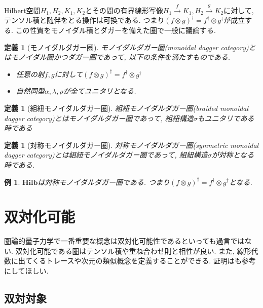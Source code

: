 \documentclass[a4paper,12pt]{ltjsarticle}
\theoremstyle{break}
\newtheorem{defn}[thm]{定義}
\newtheorem{eg}[thm]{例}
\newcommand{\hilb}{\mathbf{Hilb}}
\newcommand{\xr}[1]{\xrightarrow{#1}}
\newcommand{\al}{\alpha}
\newcommand{\la}{\lambda}
\newcommand{\si}{\sigma}
\newcommand{\da}{\dagger}
\newcommand{\ot}{\otimes}
\numberwithin{equation}{section}
\begin{document}
Hilbert空間$H_1,H_2,K_1,K_2$とその間の有界線形写像$H_1 \xr{f} K_1, H_2 \xr{g} K_2$に対して,テンソル積と随伴をとる操作は可換である. 
つまり$(f \ot g)^\da = f^\da \ot g^\da$が成立する. 
この性質をモノイダル積とダガーを備えた圏で一般に議論する. 

\begin{defn}[モノイダルダガー圏]
  モノイダルダガー圏(monoidal dagger category)とはモノイダル圏かつダガー圏であって, 以下の条件を満たすものである. 
  \begin{itemize}
    \item 任意の射$f,g$に対して$(f \ot g)^\da = f^\da \ot g^\da$
    \item 自然同型$\al, \la, \rho$が全てユニタリとなる. 
  \end{itemize}
\end{defn}

\begin{defn}[組紐モノイダルダガー圏]
  組紐モノイダルダガー圏(braided monoidal dagger category)とはモノイダルダガー圏であって, 組紐構造$\si$もユニタリである時である
\end{defn}

\begin{defn}[対称モノイダルダガー圏]
  対称モノイダルダガー圏(symmetric monoidal dagger category)とは組紐モノイダルダガー圏であって, 組紐構造$\si$が対称となる時である. 
\end{defn}

\begin{eg}
  $\hilb$は対称モノイダルダガー圏である. 
  つまり$(f \ot g)^\da = f^\da \ot g^\da$となる. 
\end{eg}

\newpage

\section{双対化可能}

圏論的量子力学で一番重要な概念は双対化可能性であるといっても過言ではない. 
双対化可能である圏はテンソル積や重ね合わせ則と相性が良い. 
また, 線形代数に出てくるトレースや次元の類似概念を定義することができる. 
証明は\cite{CWM}も参考にしてほしい.   

\subsection{双対対象}
\end{document}

